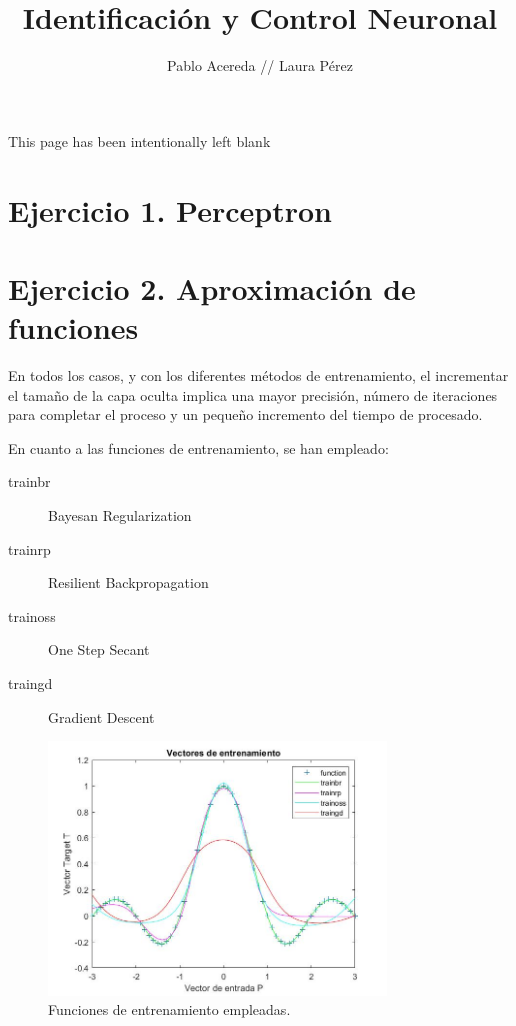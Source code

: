 \documentclass{article}
\title{Identificación y Control Neuronal}
\author{Pablo Acereda //
        Laura Pérez}
\begin{document}
\maketitle

\newpage
\vspace*{\fill}
 \begin{center}
This page has been intentionally left blank
 \end{center}
\vspace*{\fill}
\newpage

\tableofcontents

\newpage

\section{Ejercicio 1. Perceptron}

\section{Ejercicio 2. Aproximación de funciones}

En todos los casos, y con los diferentes métodos de entrenamiento, el
incrementar el tamaño de la capa oculta implica una mayor precisión, número de
iteraciones para completar el proceso y un pequeño incremento del tiempo de
procesado.

En cuanto a las funciones de entrenamiento, se han empleado:

\begin{description}
\item [trainbr] Bayesan Regularization
\item [trainrp] Resilient Backpropagation
\item [trainoss] One Step Secant
\item [traingd] Gradient Descent
\end{description}

\begin{figure}[h]
 \centering
 \includegraphics[width=0.8\textwidth]{../I_ex2/training_functions.jpg}
 \caption{Funciones de entrenamiento empleadas.} 
 \label{tf}
\end{figure}
\end{document}
